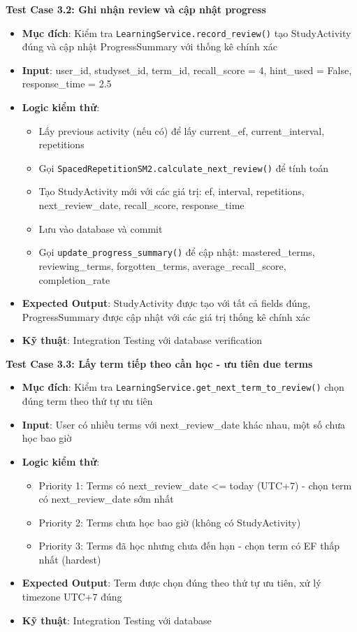 \documentclass[../DoAn.tex]{subfiles}
\begin{document}
\textbf{Test Case 3.2: Ghi nhận review và cập nhật progress}
\begin{itemize}
    \item \textbf{Mục đích}: Kiểm tra \texttt{LearningService.record\_review()} tạo StudyActivity đúng và cập nhật ProgressSummary với thống kê chính xác
    \item \textbf{Input}: user\_id, studyset\_id, term\_id, recall\_score = 4, hint\_used = False, response\_time = 2.5
    \item \textbf{Logic kiểm thử}: 
    \begin{itemize}
        \item Lấy previous activity (nếu có) để lấy current\_ef, current\_interval, repetitions
        \item Gọi \texttt{SpacedRepetitionSM2.calculate\_next\_review()} để tính toán
        \item Tạo StudyActivity mới với các giá trị: ef, interval, repetitions, next\_review\_date, recall\_score, response\_time
        \item Lưu vào database và commit
        \item Gọi \texttt{update\_progress\_summary()} để cập nhật: mastered\_terms, reviewing\_terms, forgotten\_terms, average\_recall\_score, completion\_rate
    \end{itemize}
    \item \textbf{Expected Output}: StudyActivity được tạo với tất cả fields đúng, ProgressSummary được cập nhật với các giá trị thống kê chính xác
    \item \textbf{Kỹ thuật}: Integration Testing với database verification
\end{itemize}

\textbf{Test Case 3.3: Lấy term tiếp theo cần học - ưu tiên due terms}
\begin{itemize}
    \item \textbf{Mục đích}: Kiểm tra \texttt{LearningService.get\_next\_term\_to\_review()} chọn đúng term theo thứ tự ưu tiên
    \item \textbf{Input}: User có nhiều terms với next\_review\_date khác nhau, một số chưa học bao giờ
    \item \textbf{Logic kiểm thử}: 
    \begin{itemize}
        \item Priority 1: Terms có next\_review\_date <= today (UTC+7) - chọn term có next\_review\_date sớm nhất
        \item Priority 2: Terms chưa học bao giờ (không có StudyActivity)
        \item Priority 3: Terms đã học nhưng chưa đến hạn - chọn term có EF thấp nhất (hardest)
    \end{itemize}
    \item \textbf{Expected Output}: Term được chọn đúng theo thứ tự ưu tiên, xử lý timezone UTC+7 đúng
    \item \textbf{Kỹ thuật}: Integration Testing với database
\end{itemize}
\end{document}
